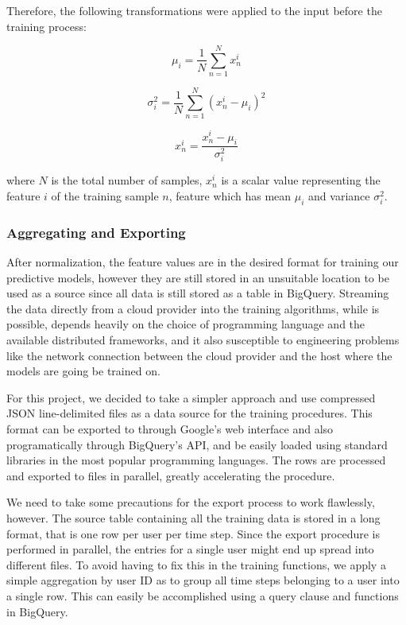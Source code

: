 \documentclass{kththesis}
\begin{document}
Therefore, the following transformations were applied to the input before the training process:

 \begin{equation}
 \mu_i = \frac{1}{N}\sum_{n=1}^{N}x_n^i
 \end{equation}

\begin{equation}
\sigma_i^2 = \frac{1}{N}\sum_{n=1}^{N}(x_n^i - \mu_i)^2
\end{equation}
 
\begin{equation}
x_n^i = \frac{x_n^i - \mu_i}{\sigma_i^2}
\end{equation}

where $N$ is the total number of samples, $x_n^i$ is a scalar value representing the feature $i$ of the training sample $n$, feature which has mean $\mu_i$ and variance $\sigma^2_i$.

\subsubsection{Aggregating and Exporting}

After normalization, the feature values are in the desired format for training our predictive models, however they are still stored in an unsuitable location to be used as a source since all data is still stored as a table in BigQuery. Streaming the data directly from a cloud provider into the training algorithms, while is possible, depends heavily on the choice of programming language and the available distributed frameworks, and it also susceptible to engineering problems like the network connection between the cloud provider and the host where the models are going be trained on.

For this project, we decided to take a simpler approach and use compressed JSON line-delimited files as a data source for the training procedures. This format can be exported to through Google's web interface and also programatically through BigQuery's API, and be easily loaded using standard libraries in the most popular programming languages. The rows are processed and exported to files in parallel, greatly accelerating the procedure.

We need to take some precautions for the export process to work flawlessly, however. The source table containing all the training data is stored in a long format, that is one row per user per time step. Since the export procedure is performed in parallel, the entries for a single user might end up spread into different files. To avoid having to fix this in the training functions, we apply a simple aggregation by user ID as to group all time steps belonging to a user into a single row. This can easily be accomplished using a query clause and functions in BigQuery.
\end{document}
